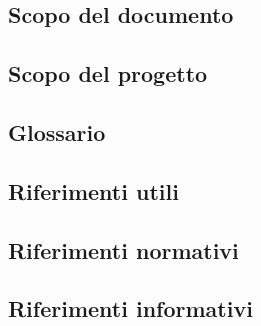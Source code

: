 \documentclass[float=false, crop=false]{standalone}
\begin{document}
	\subsection{Scopo del documento}
	\subsection{Scopo del progetto}
	\subsection{Glossario}
	\subsection{Riferimenti utili}
		\subsection{Riferimenti normativi}
		\subsection{Riferimenti informativi}
\end{document}

